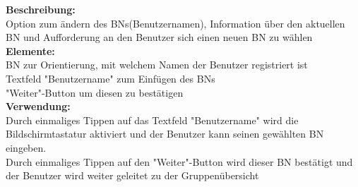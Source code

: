 \textbf{Beschreibung:}\\
Option zum ändern des BNs(Benutzernamen), Information über den aktuellen BN und Aufforderung an den Benutzer sich einen neuen BN zu wählen\\
\textbf{Elemente:}\\
BN zur Orientierung, mit welchem Namen der Benutzer registriert ist\\
Textfeld "Benutzername" zum Einfügen des BNs\\
"Weiter"-Button um diesen zu bestätigen\\
\textbf{Verwendung:}\\
Durch einmaliges Tippen auf das Textfeld "Benutzername" wird die Bildschirmtastatur aktiviert und der Benutzer kann seinen gewählten BN eingeben.\\
Durch einmaliges Tippen auf den "Weiter"-Button wird dieser BN bestätigt und der Benutzer wird weiter geleitet zu der Gruppenübersicht